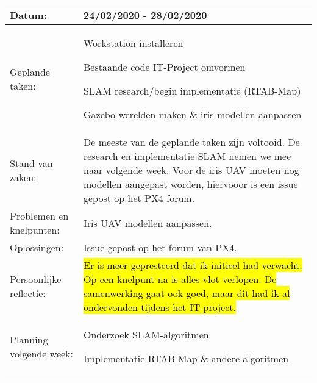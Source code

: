 \begin{tabularx}{\textwidth}{| l | X |}
  \hline
  Datum: & 24/02/2020 - 28/02/2020\\
  \hline
  Geplande taken: &
  \begin{compactitem}
    \item Workstation installeren
    \item Bestaande code IT-Project omvormen
    \item SLAM research/begin implementatie (RTAB-Map)
    \item Gazebo werelden maken \& iris modellen aanpassen
  \end{compactitem}\\
  \hline
  Stand van zaken: & De meeste van de geplande taken zijn voltooid. De research en implementatie SLAM nemen we mee naar volgende week. Voor de iris UAV moeten nog  modellen aangepast worden, hiervooor is een issue gepost op het PX4 forum.\\
  \hline
  Problemen en knelpunten: & Iris UAV modellen aanpassen.\\
  \hline
  Oplossingen: & Issue gepost op het forum van PX4.\\
  \hline
  Persoonlijke reflectie: & \hl{Er is meer gepresteerd dat ik initieel had verwacht. Op een knelpunt na is alles vlot verlopen. De samenwerking gaat ook goed, maar dit had ik al ondervonden tijdens het IT-project.}\\
  \hline
  Planning volgende week: & 
  \begin{compactitem}
    \item Onderzoek SLAM-algoritmen
    \item Implementatie RTAB-Map \& andere algoritmen
  \end{compactitem}\\
  \hline
\end{tabularx}